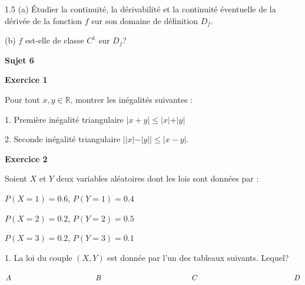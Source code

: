 \documentclass[12pt]{article}
\begin{document}
\begin{spacing}{1.5}
 (a) Étudier la continuité, la dérivabilité et la continuité éventuelle de la dérivée de la fonction $f$ sur son domaine de définition $D_f$.
 
 (b) $f$ est-elle de classe $C^1$ sur $D_f$?
 
 \quad
 
 \medskip\textbf{Sujet 6}
 
 \medskip\textbf{Exercice 1 }

 Pour tout $x,y \in \mathbb{R}$, montrer les inégalités suivantes :
 
 1. Première inégalité triangulaire $\vert x+y\vert \leq \vert x\vert + \vert y\vert$
 
 2. Seconde inégalité triangulaire $\vert\vert x\vert - \vert y\vert\vert\leq\vert x-y\vert$.
 
 \medskip\textbf{Exercice 2}

 Soient $X$ et $Y$ deux variables aléatoires dont les lois sont données par :
 
 $P(X =1)=0.6$, $P(Y =1)=0.4$
 
 $P(X =2)=0.2$, $P(Y =2)=0.5$
 
$P(X =3)=0.2$, $P(Y =3)=0.1$
 
 1. La loi du couple $(X,Y)$ est donnée par l'un des tableaux suivants. Lequel?
 
 $A\hspace{4.2cm} B \hspace{4.5cm} C \hspace{4.8cm} D$
 

\end{spacing}
\end{document}
